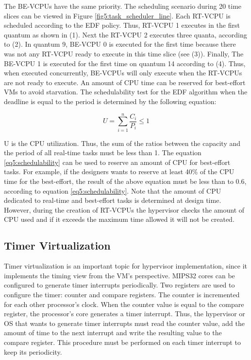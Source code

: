 The BE-VCPUs have the same priority. The scheduling scenario during 20 time slices can be viewed in Figure \ref{fig5:task_scheduler_line}. Each RT-VCPU is scheduled according to the EDF policy. Thus, RT-VCPU 1 executes in the first quantum as shown in (1). Next the RT-VCPU 2 executes three quanta, according to (2). In quantum 9, BE-VCPU 0 is executed for the first time because there was not any RT-VCPU ready to execute in this time slice (see (3)). Finally, The BE-VCPU 1 is executed for the first time on quantum 14 according to (4). Thus, when executed concurrently, BE-VCPUs will only execute when the RT-VCPUs are not ready to execute. An amount of CPU time can be reserved for best-effort VMs to avoid starvation. The schedulability test for the EDF algorithm when the deadline is equal to the period is determined by the following equation:

\begin{equation}
\label{eq5:schedulability}
\displaystyle U = \sum_{i=1}^{n} \frac{C_i}{P_i} \leq 1
\end{equation}

U is the CPU utilization. Thus, the sum of the ratios between the capacity and the period of all real-time tasks must be less than 1. The equation \ref{eq5:schedulability} can be used to reserve an amount of CPU for best-effort tasks. For example, if the designers wants to reserve at least 40\% of the CPU time for the best-effort, the result of the above equation must be less than to 0.6, according to equation \ref{eq5:schedulability}. Note that the amount of CPU dedicated to real-time and best-effort tasks is determined at design time. However, during the creation of RT-VCPUs the hypervisor checks the amount of CPU used and if it exceeds the maximum time allowed it will not be created. 



\subsection{Timer Virtualization}
\label{subsection5:timervz}
\vspace{-1cm}

Timer virtualization is an important topic for hypervisor implementation, since it implements the timing view from the VM's perspective. MIPS32 cores can be configured to generate timer interrupts periodically. Two registers are used to configure the timer: counter and compare registers. The counter is incremented for each other processor's clock. When the counter value is equal to the compare register, the processor's core generates a timer interrupt. Thus, the hypervisor or OS that wants to generate timer interrupts must read the counter value, add the amount of time to the next interrupt and write the resulting value to the compare register. This procedure must be performed on each timer interrupt to keep its periodicity. 

